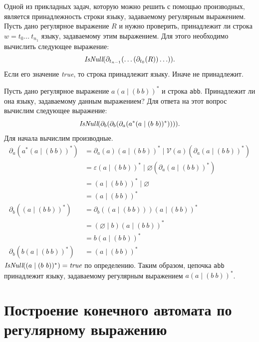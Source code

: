 Одной из прикладных задач, которую можно решить с помощью производных, является принадлежность строки языку, задаваемому регулярным выражением.
Пусть дано регулярное выражение $R$ и нужно проверить, принадлежит ли строка $w=t_0 \ldots \ t_{n_1}$ языку, задаваемому этим выражением.
Для этого необходимо вычислить следующее выражение:
\[
\emph{IsNull}(\partial_{t_{n-1}}(\ldots(\partial_{t_0}(R))\ldots)).
\]
Если его значение \emph{true}, то строка принадлежит языку.
Иначе не принадлежит.

\begin{example}
    Пусть дано регулярное выражение $a(a \mid (b \ b))^*$ и строка \texttt{abb}.
    Принадлежит ли она языку, задаваемому данным выражением?
    Для ответа на этот вопрос вычислим следующее выражение:
    \[
        \emph{IsNull}(\partial_b(\partial_b(\partial_a(a^*(a \mid (b \ b))^*)))).
    \]
    Для начала вычислим производные.
    \begin{align*}
        \partial_a(a^*(a \mid (b \ b))^*) &= \partial_a(a) (a \mid (b \ b))^* \mid \mathcal{V}(a)(\partial_a(a \mid (b \ b))^*) \\
                                          &= \varepsilon (a \mid (b \ b))^* \mid \varnothing (\partial_a(a \mid (b \ b))^*) \\
                                          &= (a \mid (b \ b))^* \mid \varnothing \\
                                          &= (a \mid (b \ b))^*\\
        \partial_b((a \mid (b \ b))^*)    &= \partial_b((a \mid (b \ b))) (a \mid (b \ b))^* \\
                                          &= (\varnothing \mid b) (a \mid (b \ b))^* \\
                                          &= b (a \mid (b \ b))^* \\
        \partial_b(b (a \mid (b \ b))^*)  &= (a \mid (b \ b))^*
    \end{align*}
    $\emph{IsNull}((a \mid (b \ b))^*) = \emph{true}$ по определению.
    Таким образом, цепочка \texttt{abb} принадлежит языку, задаваемому регулярным выражением $a(a \mid (b \ b))^*$.
\end{example}

\section{Построение конечного автомата по регулярному выражению}

